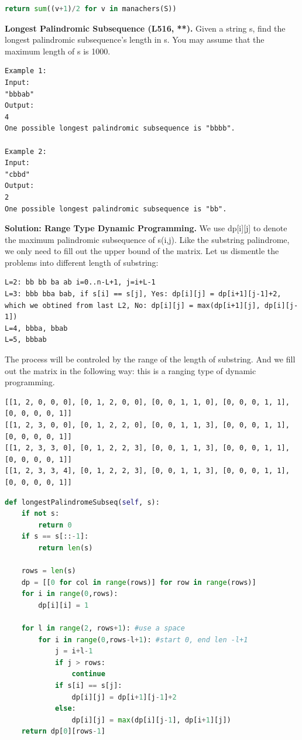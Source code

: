 \documentclass[../main.tex]{subfiles}
\begin{document}
\begin{examples}[resume]
\begin{lstlisting}[language = Python]
return sum((v+1)/2 for v in manachers(S))
\end{lstlisting}
\item \textbf{Longest Palindromic Subsequence (L516, **).} Given a string s, find the longest palindromic subsequence's length in s. You may assume that the maximum length of s is 1000. 
\begin{lstlisting}[numbers=none]
Example 1:
Input:
"bbbab"
Output:
4
One possible longest palindromic subsequence is "bbbb".

Example 2:
Input:
"cbbd"
Output:
2
One possible longest palindromic subsequence is "bb". 
\end{lstlisting}
\textbf{Solution: Range Type Dynamic Programming.} We use dp[i][j] to denote the maximum palindromic subsequence of s(i,j). Like the substring palindrome, we only need to fill out the upper bound of the matrix. Let us dismentle the problems into different length of substring:
\begin{lstlisting}[numbers=none]
L=2: bb bb ba ab i=0..n-L+1, j=i+L-1
L=3: bbb bba bab, if s[i] == s[j], Yes: dp[i][j] = dp[i+1][j-1]+2, which we obtined from last L2, No: dp[i][j] = max(dp[i+1][j], dp[i][j-1])
L=4, bbba, bbab
L=5, bbbab
\end{lstlisting}
The process will be controled by the range of the length of substring. And we fill out the matrix in the following way: this is a ranging type of dynamic programming. 
\begin{lstlisting}[numbers=none]
[[1, 2, 0, 0, 0], [0, 1, 2, 0, 0], [0, 0, 1, 1, 0], [0, 0, 0, 1, 1], [0, 0, 0, 0, 1]]
[[1, 2, 3, 0, 0], [0, 1, 2, 2, 0], [0, 0, 1, 1, 3], [0, 0, 0, 1, 1], [0, 0, 0, 0, 1]]
[[1, 2, 3, 3, 0], [0, 1, 2, 2, 3], [0, 0, 1, 1, 3], [0, 0, 0, 1, 1], [0, 0, 0, 0, 1]]
[[1, 2, 3, 3, 4], [0, 1, 2, 2, 3], [0, 0, 1, 1, 3], [0, 0, 0, 1, 1], [0, 0, 0, 0, 1]]
\end{lstlisting}
\begin{lstlisting}[language=Python]
def longestPalindromeSubseq(self, s):
    if not s:
        return 0
    if s == s[::-1]:
        return len(s)
    
    rows = len(s)
    dp = [[0 for col in range(rows)] for row in range(rows)]
    for i in range(0,rows):
        dp[i][i] = 1
    
    for l in range(2, rows+1): #use a space
        for i in range(0,rows-l+1): #start 0, end len -l+1
            j = i+l-1
            if j > rows:
                continue
            if s[i] == s[j]:
                dp[i][j] = dp[i+1][j-1]+2
            else:
                dp[i][j] = max(dp[i][j-1], dp[i+1][j])
    return dp[0][rows-1]
\end{lstlisting}
\end{examples}
\end{document}

